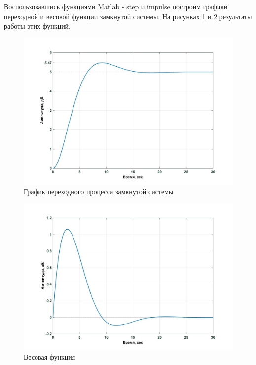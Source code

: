 \documentclass[a4paper, 12pt]{article}
\begin{document}
\newpage

Воспользовавшись функциями Matlab - step и impulse построим графики переходной и весовой функции замкнутой системы. На рисунках \ref{step2} и  \ref{impulse2} результаты работы этих функций. 

\begin{figure}[h!]
	\centering
	\includegraphics[width = 0.57\textheight]{data/step2}
	\caption{График переходного процесса замкнутой системы}
	\label{step2}
\end{figure}

\begin{figure}[h!]
	\centering
	\includegraphics[width = 0.57\textheight]{data/impulse2}
	\caption{Весовая функция}
	\label{impulse2}
\end{figure}\par
\end{document}
